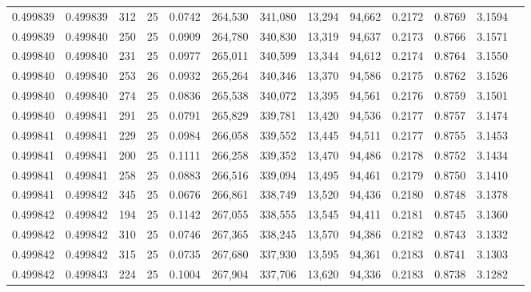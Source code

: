 \begin{tabular}{rrrrrrrrrrrrr}
0.499839 & 0.499839 &   312 &  25 &                                     0.0742 & 264,530 & 341,080 &  13,294 &  94,662 & 0.2172 & 0.8769 & 3.1594 \\
0.499839 & 0.499840 &   250 &  25 &                                     0.0909 & 264,780 & 340,830 &  13,319 &  94,637 & 0.2173 & 0.8766 & 3.1571 \\
0.499840 & 0.499840 &   231 &  25 &                                     0.0977 & 265,011 & 340,599 &  13,344 &  94,612 & 0.2174 & 0.8764 & 3.1550 \\
0.499840 & 0.499840 &   253 &  26 &                                     0.0932 & 265,264 & 340,346 &  13,370 &  94,586 & 0.2175 & 0.8762 & 3.1526 \\
0.499840 & 0.499840 &   274 &  25 &                                     0.0836 & 265,538 & 340,072 &  13,395 &  94,561 & 0.2176 & 0.8759 & 3.1501 \\
0.499840 & 0.499841 &   291 &  25 &                                     0.0791 & 265,829 & 339,781 &  13,420 &  94,536 & 0.2177 & 0.8757 & 3.1474 \\
0.499841 & 0.499841 &   229 &  25 &                                     0.0984 & 266,058 & 339,552 &  13,445 &  94,511 & 0.2177 & 0.8755 & 3.1453 \\
0.499841 & 0.499841 &   200 &  25 &                                     0.1111 & 266,258 & 339,352 &  13,470 &  94,486 & 0.2178 & 0.8752 & 3.1434 \\
0.499841 & 0.499841 &   258 &  25 &                                     0.0883 & 266,516 & 339,094 &  13,495 &  94,461 & 0.2179 & 0.8750 & 3.1410 \\
0.499841 & 0.499842 &   345 &  25 &                                     0.0676 & 266,861 & 338,749 &  13,520 &  94,436 & 0.2180 & 0.8748 & 3.1378 \\
0.499842 & 0.499842 &   194 &  25 &                                     0.1142 & 267,055 & 338,555 &  13,545 &  94,411 & 0.2181 & 0.8745 & 3.1360 \\
0.499842 & 0.499842 &   310 &  25 &                                     0.0746 & 267,365 & 338,245 &  13,570 &  94,386 & 0.2182 & 0.8743 & 3.1332 \\
0.499842 & 0.499842 &   315 &  25 &                                     0.0735 & 267,680 & 337,930 &  13,595 &  94,361 & 0.2183 & 0.8741 & 3.1303 \\
0.499842 & 0.499843 &   224 &  25 &                                     0.1004 & 267,904 & 337,706 &  13,620 &  94,336 & 0.2183 & 0.8738 & 3.1282 \\

\end{tabular}
